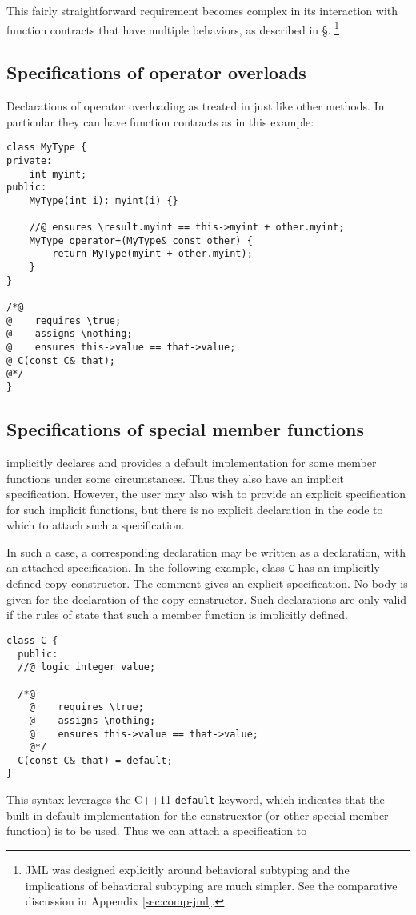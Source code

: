 This fairly straightforward requirement becomes complex in its interaction with function contracts that have multiple behaviors, 
as described in \S {}.
\footnote{JML was designed explicitly around behavioral subtyping and the implications of behavioral subtyping are much simpler. 
	See the comparative discussion in Appendix \ref{sec:comp-jml}.}


\subsection{Specifications of operator overloads}
Declarations of operator overloading as treated in \NAME just like other
methods. In particular they can have function contracts as in this example:
\begin{lstlisting}
class MyType {
private:
    int myint;
public:
    MyType(int i): myint(i) {}

    //@ ensures \result.myint == this->myint + other.myint;
    MyType operator+(MyType& const other) {
        return MyType(myint + other.myint);
    }
}

/*@
@    requires \true;
@    assigns \nothing;
@    ensures this->value == that->value;
@ C(const C& that);
@*/
}
\end{lstlisting}
\subsection{Specifications of special member functions}

\lang implicitly declares and provides a default implementation for some member functions under some circumstances. 
Thus they also have an implicit specification. However, the user may also wish to provide an explicit specification for such implicit functions, but there is no
explicit declaration in the \lang code to which to attach such a 
specification.

In such a case, a corresponding declaration may be written as a \NAME 
declaration, with an attached specification. 
In the following example, class \lstinline|C| has an implicitly defined
copy constructor. The \NAME comment gives an explicit specification.
No body is given for the declaration of the \lang copy constructor.
Such declarations are only valid if the rules of \lang state that such
a member function is implicitly defined.
\begin{lstlisting}
class C {
  public:
  //@ logic integer value;
  
  /*@
    @    requires \true;
    @    assigns \nothing;
    @    ensures this->value == that->value;
    @*/
  C(const C& that) = default;
}
\end{lstlisting}
This syntax leverages the C++11 \lstinline|default| keyword, which indicates that the built-in default implementation for the construcxtor (or other special member function) is to be used. Thus we can attach a specification to 


